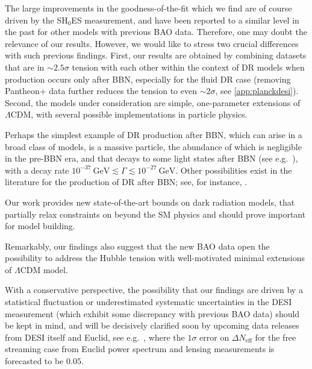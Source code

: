 \documentclass[aps,prd,twocolumn,notitlepage,
superscriptaddress,
nofootinbib,floatfix]{revtex4-2}
\begin{document}
The large improvements in the goodness-of-the-fit which we find are of course driven by the SH$_0$ES measurement, and have been reported to a similar level in the past for other models with previous BAO data. Therefore, one may doubt the relevance of our results. However, we would like to stress two crucial differences with such previous findings. First, our results are obtained by combining datasets that are in $\sim 2.5\sigma$ tension with each other within the context of DR models when production occurs only after BBN, especially for the fluid DR case (removing Pantheon+ data further reduces the tension to even $\sim2\sigma$, see \cref{app:planckdesi}). Second, the models under consideration are simple, one-parameter extensions of $\Lambda$CDM, with several possible implementations in particle physics. 

Perhaps the simplest example of DR production after BBN, which can arise in a broad class of models, is a massive particle, the abundance of which is negligible in the pre-BBN era, and that decays to some light states after BBN (see e.g.~\cite{Ichikawa:2007jv, Fischler:2010xz, Hooper:2011aj, Bjaelde:2012wi, Choi:2012zna, Hasenkamp:2012ii}),
with a decay rate 
$10^{-37}~\text{GeV}\lesssim\Gamma\lesssim 10^{-27}~\text{GeV}$.
Other possibilities exist in the literature for the production of DR after BBN; see, for instance, \cite{Ferreira:2022zzo, Aloni:2023tff}.


Our work provides new state-of-the-art bounds on dark radiation models, that partially relax constraints on beyond the SM physics and should prove important for model building.

Remarkably, our findings also suggest that the new BAO data open the possibility to address the Hubble tension with well-motivated minimal extensions of $\Lambda$CDM model. 

With a conservative perspective, the possibility that our findings are driven by a statistical fluctuation or underestimated systematic uncertainties in the DESI measurement (which exhibit some discrepancy with previous BAO data) should be kept in mind, and will be decisively clarified soon by upcoming data releases from DESI itself and Euclid, see e.g.~\cite{Brinckmann:2018owf}, where the $1\sigma$ error on $\Delta N_\text{eff}$ for the free streaming case from Euclid power spectrum and lensing measurements is forecasted to be $0.05$.


\end{document}

